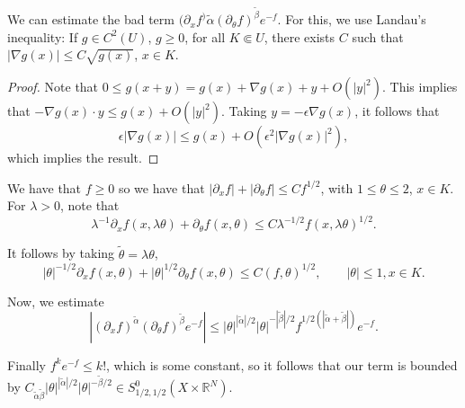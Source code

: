 \documentclass[12pt]{scrartcl}
\newcommand{\R}{\mathbb{R}}
\newcommand{\<}{\langle}
\renewcommand{\>}{\rangle}
\let \grad \nabla
\begin{document}
We can estimate the bad term $(\partial_x f^){\tilde{\alpha}} (\partial_\theta f)^{\tilde{\beta}}  e^{-f}$.  For this, we use Landau's inequality: If $g \in C^2(U)$, $g \ge 0$, for all $K \Subset U$, there exists $C$ such that $|\grad g(x)| \le C \sqrt{g(x)}$, $x \in K$.
\begin{proof}
Note that $0 \le g(x + y) = g(x) + \grad g(x) + y + O(|y|^2)$. This implies that $-\grad g(x) \cdot y \le g(x) + O(|y|^2)$.  Taking $y = -\epsilon \grad g(x)$, it follows that 
$$\epsilon |\grad g(x)| \le g(x) + O(\epsilon^2 |\grad g(x)|^2),$$
which implies the result.  
\end{proof}


We have that $f \ge 0$ so we have that $|\partial_x f| + |\partial_\theta f| \le C f^{1/2}$, with $1 \le \theta \le 2$, $x \in K$.  For $\lambda > 0$, note that $$\lambda^{-1} \partial_x f(x, \lambda \theta) + \partial_\theta f(x, \theta) \le C \lambda^{-1/2} f(x, \lambda \theta)^{1/2}.$$

It follows by taking $\tilde \theta = \lambda \theta$,
$$|\theta|^{-1/2} \partial_x f(x, \theta) + |\theta|^{1/2} \partial_\theta f(x, \theta) \le C(f, \theta)^{1/2}, \qquad |\theta| \le 1, x \in K.$$

Now, we estimate 
$$|(\partial_x f)^{\tilde{\alpha}} (\partial_\theta f)^{\tilde{\beta}}  e^{-f} | \le |\theta|^{|\tilde{\alpha}|/2}|\theta|^{-|\tilde{\beta}|/2} f^{1/2(|\tilde{\alpha} + \tilde{\beta}|)} e^{-f}.$$

Finally $f^k e^{-f} \le k!$, which is some constant, so it follows that our term is bounded by $C_{\tilde{\alpha}\tilde{\beta}} |\theta|^{|\tilde{\alpha}|/2} |\theta|^{-\tilde{\beta}/2} \in S_{1/2, 1/2}^0 (X \times \R^N)$.
\end{document}
